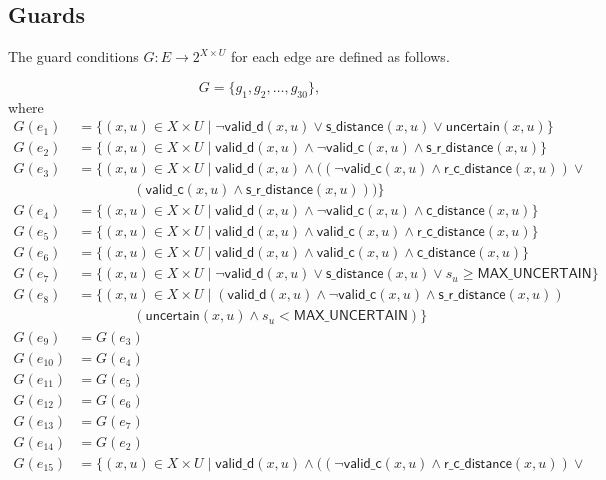 \documentclass[12pt]{article}
\theoremstyle{definition}
\begin{document}
\subsection{Guards}

The guard conditions $G: E \to 2^{X \times U}$ for each edge are defined as follows.

\[
G = \{ g_1, g_2, \dots, g_{30} \},
\]
where
\[
\begin{aligned}
G(e_1)  &= \{(x,u) \in X \times U \mid \neg \mathsf{valid\_d}(x,u) \lor \mathsf{s\_distance}(x,u) \lor \mathsf{uncertain}(x,u)\} \\
G(e_2)  &= \{(x,u) \in X \times U \mid \mathsf{valid\_d}(x,u) \land \neg \mathsf{valid\_c}(x,u) \land \mathsf{s\_r\_distance}(x,u)\} \\
G(e_3)  &= \{(x,u) \in X \times U \mid \mathsf{valid\_d}(x,u) \land ((\neg \mathsf{valid\_c}(x,u) \land \mathsf{r\_c\_distance}(x,u)) \lor \\ 
&\qquad\qquad(\mathsf{valid\_c}(x,u) \land \mathsf{s\_r\_distance}(x,u)))\} \\
G(e_4)  &= \{(x,u) \in X \times U \mid \mathsf{valid\_d}(x,u) \land \neg \mathsf{valid\_c}(x,u) \land \mathsf{c\_distance}(x,u)\} \\
G(e_5)  &= \{(x,u) \in X \times U \mid \mathsf{valid\_d}(x,u) \land \mathsf{valid\_c}(x,u) \land \mathsf{r\_c\_distance}(x,u)\} \\
G(e_6)  &= \{(x,u) \in X \times U \mid \mathsf{valid\_d}(x,u) \land \mathsf{valid\_c}(x,u) \land \mathsf{c\_distance}(x,u)\} \\
G(e_7)  &= \{(x,u) \in X \times U \mid \neg \mathsf{valid\_d}(x,u) \lor \mathsf{s\_distance}(x,u) \lor s_u \ge \mathsf{MAX\_UNCERTAIN}\} \\
G(e_8)  &= \{(x,u) \in X \times U \mid (\mathsf{valid\_d}(x,u) \land \neg \mathsf{valid\_c}(x,u) \land \mathsf{s\_r\_distance}(x,u))  \\ 
&\qquad\qquad(\mathsf{uncertain}(x,u) \land s_u < \mathsf{MAX\_UNCERTAIN})\} \\
G(e_9) &= G(e_3) \\ 
G(e_{10}) &= G(e_4) \\
G(e_{11}) &= G(e_5) \\ 
G(e_{12}) &= G(e_6) \\
G(e_{13}) &= G(e_7) \\ 
G(e_{14}) &= G(e_2) \\ 
G(e_{15}) &= \{(x,u) \in X \times U \mid \mathsf{valid\_d}(x,u) \land \big( (\neg \mathsf{valid\_c}(x,u) \land \mathsf{r\_c\_distance}(x,u)) \lor \\ 

\end{aligned}\]
\end{document}

